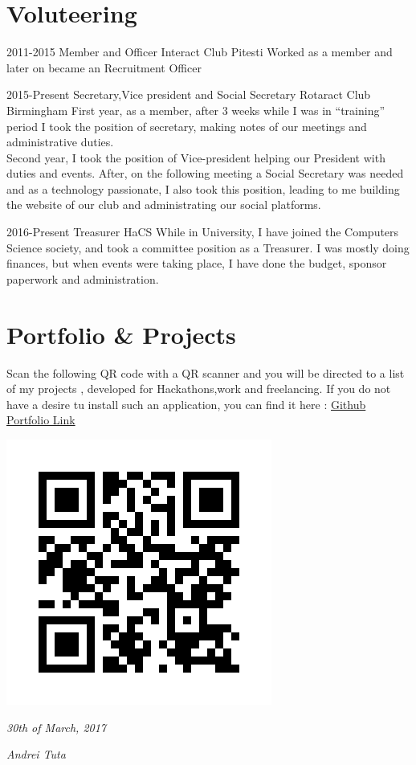 \documentclass[]{friggeri-cv}
\begin{document}
\section{Voluteering}
\begin{entrylist}
    \entry
    {2011-2015}
    {Member and Officer}
    {Interact Club Pitesti}
    {Worked as a member and later on became an Recruitment Officer}
    ~
    
    \entry
    {2015-Present}
    {Secretary,Vice president and Social Secretary}
    {Rotaract Club Birmingham}
    {First year, as a member, after 3 weeks while I was in “training” period I took the position of secretary, making notes of our meetings and administrative duties. \\Second year, I took the position of Vice-president helping our President with duties and events. After, on the following meeting a Social Secretary was needed and as a technology passionate, I also took this position, leading to me building the website of our club and administrating our social platforms.}
    ~
    
    \entry
    {2016-Present}
    {Treasurer}
    {HaCS}
    {While in University, I have joined the Computers Science society, and took a committee position as a Treasurer. I was mostly doing finances, but when events were taking place, I have done the budget, sponsor paperwork and administration.}
    ~ 
    
\end{entrylist}

\section{Portfolio \& Projects}
  \setlength{\parindent}{10ex}
    {Scan the following QR code with a QR scanner and you will be directed to a list of my projects , developed for Hackathons,work and freelancing.
    If you do not have a desire tu install such an application, you can find it here : \href{https://github.com/AndreiTuta/CV }{Github Portfolio Link} \n }\par
\includegraphics[scale=0.30]{img/static_qr_code_without_logo.jpg}
\n

\begin{flushleft}
\emph{30th of March, 2017}
\end{flushleft}
\begin{flushright}
\emph{Andrei Tuta}
\end{flushright}
\end{document}
